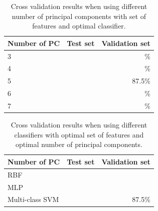 \begin{table}
\begin{center}
\begin{tabular}{| l | r | r |}
\hline
Number of PC & Test set & Validation set \\ \hline
3 & & \% \\
4 & & \% \\
5 & & 87.5\% \\
6 & & \% \\
7 & & \% \\
\hline
\end{tabular}
\end{center}
\caption{Cross validation results when using different number of principal components with set of features and optimal classifier.}
\label{tab:pca}
\end{table}

\begin{table}
\begin{center}
\begin{tabular}{| l | r | r |}
\hline
Number of PC & Test set & Validation set \\ \hline
RBF & &  \\
MLP & &  \\
Multi-class SVM & & 87.5\% \\
\hline
\end{tabular}
\end{center}
\caption{Cross validation results when using different classifiers with optimal set of features and optimal number of principal components.}
\label{tab:classify}
\end{table}